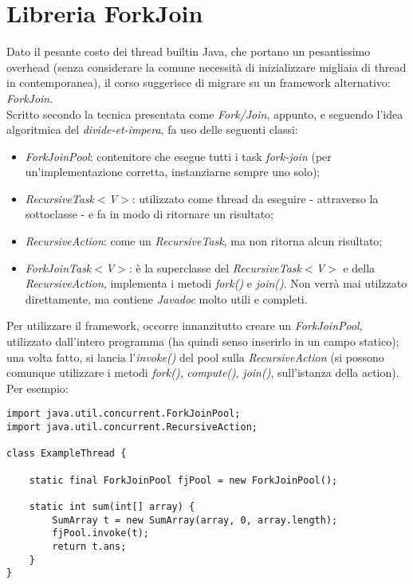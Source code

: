 \section{Libreria ForkJoin}
Dato il pesante costo dei thread builtin Java, che portano un pesantissimo overhead (senza considerare la comune necessità di inizializzare migliaia di thread in contemporanea), il corso suggerisce di migrare su un framework alternativo: \textit{ForkJoin}. \\
Scritto secondo la tecnica presentata come \textit{Fork/Join}, appunto, e seguendo l'idea algoritmica del \textit{divide-et-impera}, fa uso delle seguenti classi:
\begin{itemize}
	\item \textit{ForkJoinPool}: contenitore che esegue tutti i task \textit{fork-join} (per un'implementazione corretta, instanziarne sempre uno solo);
	\item \textit{RecursiveTask$<$V$>$}: utilizzato come thread da eseguire - attraverso la sottoclasse - e fa in modo di ritornare un risultato;
	\item \textit{RecursiveAction}: come un \textit{RecursiveTask}, ma non ritorna alcun risultato;
	\item \textit{ForkJoinTask$<$V$>$}: è la superclasse del \textit{RecursiveTask$<$V$>$} e della \textit{RecursiveAction}, implementa i metodi \textit{fork()} e \textit{join()}. Non verrà mai utilzzato direttamente, ma contiene \textit{Javadoc} molto utili e completi.
\end{itemize}

Per utilizzare il framework, occorre innanzitutto creare un \textit{ForkJoinPool}, utilizzato dall'intero programma (ha quindi senso inserirlo in un campo statico); una volta fatto, si lancia l'\textit{invoke()} del pool sulla \textit{RecursiveAction} (si possono comunque utilizzare i metodi \textit{fork()}, \textit{compute()}, \textit{join()}, sull'istanza della action). \\
Per esempio:
\begin{lstlisting}
import java.util.concurrent.ForkJoinPool;
import java.util.concurrent.RecursiveAction;

class ExampleThread {

	static final ForkJoinPool fjPool = new ForkJoinPool();

	static int sum(int[] array) {
		SumArray t = new SumArray(array, 0, array.length);
		fjPool.invoke(t);
		return t.ans;
	}
}
\end{lstlisting}

